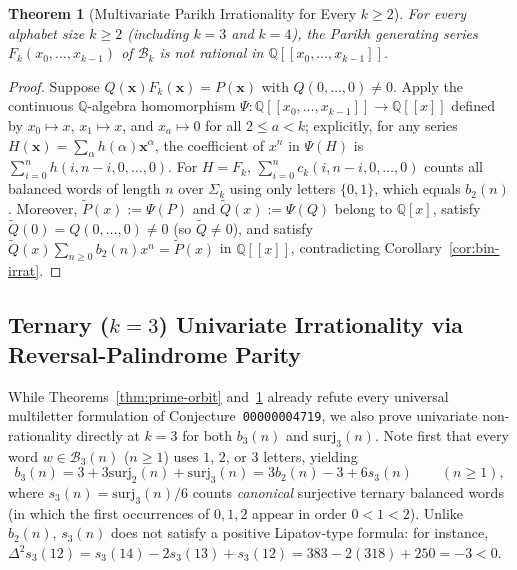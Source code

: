\documentclass[11pt,a4paper]{article}
\newtheorem{theorem}{Theorem}[section]
\theoremstyle{definition}
\newcommand{\Q}{\mathbb{Q}}
\newcommand{\surj}{\mathrm{surj}}
\begin{document}
\begin{theorem}[Multivariate Parikh Irrationality for Every $k \ge 2$]
\label{thm:parikh}
For \emph{every} alphabet size $k \ge 2$ (including $k = 3$ and $k = 4$), the Parikh generating series $F_k(x_0,\dots,x_{k-1})$ of $\mathcal{B}_k$ is \emph{not} rational in $\Q[[x_0,\dots,x_{k-1}]]$.
\end{theorem}

\begin{proof}
Suppose $Q(\mathbf{x}) F_k(\mathbf{x}) = P(\mathbf{x})$ with $Q(0,\dots,0) \neq 0$. Apply the continuous $\Q$-algebra homomorphism $\Psi : \Q[[x_0,\dots,x_{k-1}]] \to \Q[[x]]$ defined by $x_0 \mapsto x$, $x_1 \mapsto x$, and $x_a \mapsto 0$ for all $2 \le a < k$; explicitly, for any series $H(\mathbf{x}) = \sum_\alpha h(\alpha)\mathbf{x}^\alpha$, the coefficient of $x^n$ in $\Psi(H)$ is $\sum_{i=0}^n h(i, n - i, 0, \dots, 0)$. For $H = F_k$, $\sum_{i=0}^n c_k(i, n - i, 0, \dots, 0)$ counts all balanced words of length $n$ over $\Sigma_k$ using only letters $\{0, 1\}$, which equals $b_2(n)$. Moreover, $\widetilde{P}(x) := \Psi(P)$ and $\widetilde{Q}(x) := \Psi(Q)$ belong to $\Q[x]$, satisfy $\widetilde{Q}(0) = Q(0,\dots,0) \neq 0$ (so $\widetilde{Q} \neq 0$), and satisfy $\widetilde{Q}(x) \sum_{n \ge 0} b_2(n)x^n = \widetilde{P}(x)$ in $\Q[[x]]$, contradicting Corollary~\ref{cor:bin-irrat}.
\end{proof}

\subsection{Ternary (\texorpdfstring{$k = 3$}{k = 3}) Univariate Irrationality via Reversal-Palindrome Parity}

While Theorems~\ref{thm:prime-orbit} and~\ref{thm:parikh} already refute every universal multiletter formulation of Conjecture~\texttt{00000004719}, we also prove univariate non-rationality directly at $k = 3$ for both $b_3(n)$ and $\surj_3(n)$. Note first that every word $w \in \mathcal{B}_3(n)$ ($n \ge 1$) uses $1$, $2$, or $3$ letters, yielding
\begin{equation}
\label{eq:b3-surj3}
  b_3(n) = 3 + 3\surj_2(n) + \surj_3(n) = 3 b_2(n) - 3 + 6 s_3(n) \qquad (n \ge 1),
\end{equation}
where $s_3(n) = \surj_3(n) / 6$ counts \emph{canonical} surjective ternary balanced words (in which the first occurrences of $0, 1, 2$ appear in order $0 < 1 < 2$). Unlike $b_2(n)$, $s_3(n)$ does not satisfy a positive Lipatov-type formula: for instance, $\Delta^2 s_3(12) = s_3(14) - 2s_3(13) + s_3(12) = 383 - 2(318) + 250 = -3 < 0$.
\end{document}
